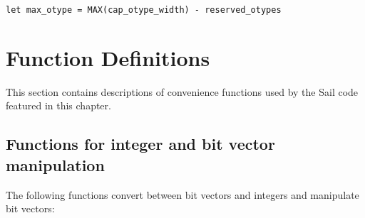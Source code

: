 \label{sailRISCVzcapzyhpermszywidth}
\sailRISCVtypecapHpermsWidth{}
\label{sailRISCVzcapzyupermszywidth}
\sailRISCVtypecapUpermsWidth{}
\label{sailRISCVzcapzyupermszyshift}
\sailRISCVtypecapUpermsShift{}
\label{sailRISCVzcapzyflagszywidth}
\sailRISCVtypecapFlagsWidth{}
\label{sailRISCVzcapzyotypezywidth}
\sailRISCVtypecapOtypeWidth{}

\begin{lstlisting}[language=sail,label=sailRISCVzmaxzyotype]
let max_otype = MAX(cap_otype_width) - reserved_otypes
\end{lstlisting}

\section{Function Definitions}

This section contains descriptions of convenience functions used by the Sail code featured in this chapter.

\subsection*{Functions for integer and bit vector manipulation}

The following functions convert between bit vectors and integers and manipulate bit vectors:

\medskip
{}


\label{sailRISCVzEXTZ}

\label{sailRISCVzEXTS}

